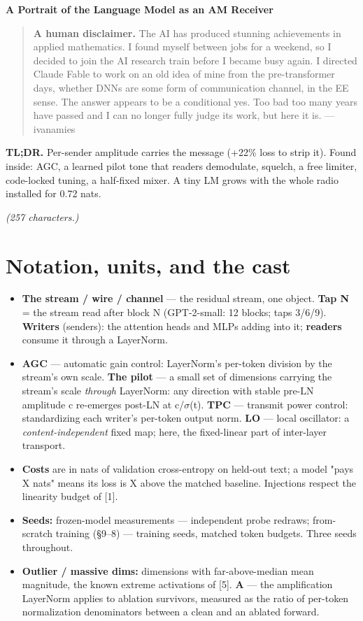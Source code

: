 \documentclass[10pt]{article}
\begin{document}
\begin{center}{\LARGE\bfseries A Portrait of the Language Model as an AM Receiver}\end{center}

\begin{quote}\textbf{A human disclaimer.} The AI has produced stunning achievements in applied mathematics. I found myself between jobs for a weekend, so I decided to join the AI research train before I became busy again. I directed Claude Fable to work on an old idea of mine from the pre-transformer days, whether DNNs are some form of communication channel, in the EE sense. The answer appears to be a conditional yes. Too bad too many years have passed and I can no longer fully judge its work, but here it is. --- ivanamies\end{quote}

\textbf{TL;DR.} Per-sender amplitude carries the message (+22\% loss to strip it). Found inside: AGC, a learned
pilot tone that readers demodulate, squelch, a free limiter, code-locked tuning, a half-fixed
mixer. A tiny LM grows with the whole radio installed for 0.72 nats.

\emph{(257 characters.)}

\section{Notation, units, and the cast}

\begin{itemize}\setlength\itemsep{1pt}
\item \textbf{The stream / wire / channel} --- the residual stream, one object. \textbf{Tap N} = the stream read after block N (GPT-2-small: 12 blocks; taps 3/6/9). \textbf{Writers} (senders): the attention heads and MLPs adding into it; \textbf{readers} consume it through a LayerNorm.
\item \textbf{AGC} --- automatic gain control: LayerNorm's per-token division by the stream's own scale. \textbf{The pilot} --- a small set of dimensions carrying the stream's scale \emph{through} LayerNorm: any direction with stable pre-LN amplitude c re-emerges post-LN at c/$\sigma$(t). \textbf{TPC} --- transmit power control: standardizing each writer's per-token output norm. \textbf{LO} --- local oscillator: a \emph{content-independent} fixed map; here, the fixed-linear part of inter-layer transport.
\item \textbf{Costs} are in nats of validation cross-entropy on held-out text; a model "pays X nats" means its loss is X above the matched baseline. Injections respect the linearity budget of [1].
\item \textbf{Seeds:} frozen-model measurements --- independent probe redraws; from-scratch training (§9--8) --- training seeds, matched token budgets. Three seeds throughout.
\item \textbf{Outlier / massive dims:} dimensions with far-above-median mean magnitude, the known extreme activations of [5]. \textbf{A} --- the amplification LayerNorm applies to ablation survivors, measured as the ratio of per-token normalization denominators between a clean and an ablated forward.
\end{itemize}
\end{document}
